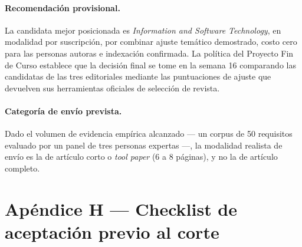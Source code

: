 \documentclass[journal,onecolumn]{IEEEtran}
\begin{document}
	\paragraph{Recomendación provisional.}
	La candidata mejor posicionada es \emph{Information and Software Technology},
	en modalidad por suscripción, por combinar ajuste temático demostrado, costo
	cero para las personas autoras e indexación confirmada. La política del
	Proyecto Fin de Curso establece que la decisión final se tome en la semana 16
	comparando las candidatas de las tres editoriales mediante las puntuaciones
	de ajuste que devuelven sus herramientas oficiales de selección de revista.
	
	\paragraph{Categoría de envío prevista.}
	Dado el volumen de evidencia empírica alcanzado --- un corpus de 50
	requisitos evaluado por un panel de tres personas expertas ---, la modalidad
	realista de envío es la de artículo corto o \emph{tool paper} (6 a 8
	páginas), y no la de artículo completo.
	
	\section*{Apéndice H --- Checklist de aceptación previo al corte}
	\label{ap:checklist}
	
\end{document}
